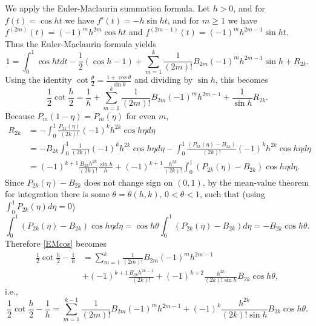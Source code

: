 \documentclass{article}
\begin{document}
We apply the Euler-Maclaurin summation formula.
Let $h>0$, and for $f(t)=\cos ht$ we have $f'(t)=-h\sin ht$, and for $m \geq 1$ we have
$f^{(2m)}(t)=(-1)^m h^{2m} \cos ht$ and $f^{(2m-1)}(t)=(-1)^m h^{2m-1} \sin ht$. 
Thus the Euler-Maclaurin formula yields
\[
1 = \int_0^1 \cos ht dt - \frac{1}{2}(\cos h - 1)
+\sum_{m=1}^k \frac{1}{(2m)!} B_{2m} (-1)^m h^{2m-1} \sin h + R_{2k}.
\]
Using the identity $\cot \frac{\theta}{2} = \frac{1+\cos \theta}{\sin \theta}$ and dividing by $\sin h$, this becomes
\begin{equation}
\frac{1}{2} \cot \frac{h}{2} =\frac{1}{h} 
+\sum_{m=1}^k \frac{1}{(2m)!} B_{2m} (-1)^m h^{2m-1} + \frac{1}{\sin h} R_{2k}.
\label{EMcos}
\end{equation}
Because $P_m(1-\eta)=P_m(\eta)$ for even $m$,
\begin{align*}
R_{2k}& = - \int_0^1 \frac{P_{2k}(\eta)}{(2k)!}(-1)^k h^{2k} \cos h\eta d\eta\\
&=- B_{2k} \int_0^1 \frac{1}{(2k)!}(-1)^k h^{2k} \cos h\eta d\eta
- \int_0^1 \frac{(P_{2k}(\eta)-B_{2k})}{(2k)!}(-1)^k h^{2k} \cos h\eta d\eta
\\
&=(-1)^{k+1} \frac{B_{2k} h^{2k}}{(2k)!}  \frac{\sin h}{h}
+(-1)^{k+1} \frac{h^{2k}}{(2k)!} \int_0^1 (P_{2k}(\eta)-B_{2k})  \cos h\eta d\eta.
\end{align*}
Since $P_{2k}(\eta)-B_{2k}$ does not change sign on $(0,1)$, by the mean-value theorem for integration there
is some $\theta=\theta(h,k)$, $0<\theta<1$, such that (using 
$\int_0^1 P_{2k}(\eta) d\eta=0$)
\[
 \int_0^1 (P_{2k}(\eta)-B_{2k})  \cos h\eta d\eta=
 \cos h\theta  \int_0^1 (P_{2k}(\eta)-B_{2k}) d\eta 
 =-B_{2k} \cos h\theta.
\]
Therefore \eqref{EMcos} becomes
\begin{align*}
\frac{1}{2} \cot \frac{h}{2} - \frac{1}{h}&=
\sum_{m=1}^k \frac{1}{(2m)!} B_{2m} (-1)^m h^{2m-1}\\
&+(-1)^{k+1} \frac{B_{2k} h^{2k-1}}{(2k)!}+(-1)^{k+2} \frac{h^{2k}}{(2k)! \sin h}B_{2k} \cos h\theta,
\end{align*}
i.e., 
\[
\frac{1}{2} \cot \frac{h}{2} - \frac{1}{h}=
\sum_{m=1}^{k-1} \frac{1}{(2m)!} B_{2m} (-1)^m h^{2m-1}+(-1)^k \frac{h^{2k}}{(2k)! \sin h}B_{2k} \cos h\theta.
\]
\end{document}
